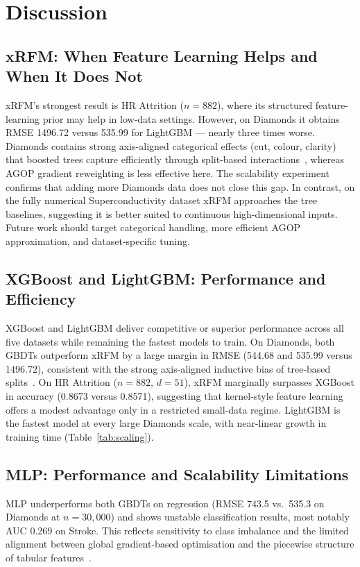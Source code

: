 
\section{Discussion}

\subsection{xRFM: When Feature Learning Helps and When It Does Not}

xRFM's strongest result is HR Attrition ($n=882$), where its structured feature-learning prior may help in low-data settings. However, on Diamonds it obtains RMSE 1496.72 versus 535.99 for LightGBM — nearly three times worse. Diamonds contains strong axis-aligned categorical effects (cut, colour, clarity) that boosted trees capture efficiently through split-based interactions~\citep{chen2016xgboost,ke2017lightgbm}, whereas AGOP gradient reweighting is less effective here. The scalability experiment confirms that adding more Diamonds data does not close this gap. In contrast, on the fully numerical Superconductivity dataset xRFM approaches the tree baselines, suggesting it is better suited to continuous high-dimensional inputs. Future work should target categorical handling, more efficient AGOP approximation, and dataset-specific tuning.

\subsection{XGBoost and LightGBM: Performance and Efficiency}
\label{sec:gbdt-discussion}

XGBoost and LightGBM deliver competitive or superior performance across all five datasets while remaining the fastest models to train. On Diamonds, both GBDTs outperform xRFM by a large margin in RMSE (544.68 and 535.99 versus 1496.72), consistent with the strong axis-aligned inductive bias of tree-based splits~\citep{grinsztajn2022tree}. On HR Attrition ($n=882$, $d=51$), xRFM marginally surpasses XGBoost in accuracy (0.8673 versus 0.8571), suggesting that kernel-style feature learning offers a modest advantage only in a restricted small-data regime. LightGBM is the fastest model at every large Diamonds scale, with near-linear growth in training time (Table~\ref{tab:scaling}).

\subsection{MLP: Performance and Scalability Limitations}
\label{sec:mlp-discussion}

MLP underperforms both GBDTs on regression (RMSE 743.5 vs.\ 535.3 on Diamonds at $n=30{,}000$) and shows unstable classification results, most notably AUC 0.269 on Stroke. This reflects sensitivity to class imbalance and the limited alignment between global gradient-based optimisation and the piecewise structure of tabular features~\citep{holzmuller2024better}.
